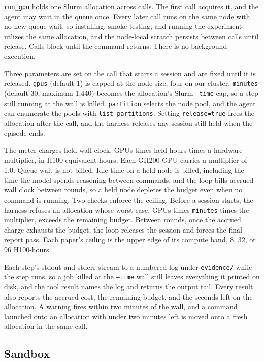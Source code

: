 \documentclass{article} %
\begin{document}
\texttt{run\_gpu} holds one Slurm allocation across calls. The first call
acquires it, and the agent may wait in the queue once. Every later call runs
on the same node with no new queue wait, so installing, smoke-testing, and
running the experiment utlizes the same allocation, and the node-local scratch
persists between calls until release. Calls block until the command returns.
There is no background execution.

Three parameters are set on the call that starts a session and are fixed
until it is released. \texttt{gpus} (default 1) is capped at the node size,
four on our cluster. \texttt{minutes} (default 30, maximum 1{,}440) becomes
the allocation's Slurm \texttt{--time} cap, so a step still running at the
wall is killed. \texttt{partition} selects the node pool, and the agent can
enumerate the pools with \texttt{list\_partitions}. Setting
\texttt{release=true} frees the allocation after the call, and the harness
releases any session still held when the episode ends.

The meter charges held wall clock, GPUs times held hours times a hardware
multiplier, in H100-equivalent hours. Each GH200 GPU carries a multiplier of
1.0.
Queue wait is not billed. Idle time on a held node is billed, including the
time the model spends reasoning between commands, and the loop bills accrued
wall clock between rounds, so a held node depletes the budget even when no
command is running. Two checks enforce the ceiling. Before a session starts,
the harness refuses an allocation whose worst case, GPUs times
\texttt{minutes} times the multiplier, exceeds the remaining budget. Between
rounds, once the accrued charge exhausts the budget, the loop releases the
session and forces the final report pass. Each paper's ceiling is the upper
edge of its compute band, 8, 32, or 96 H100-hours.

Each step's stdout and stderr stream to a numbered log under
\texttt{evidence/} while the step runs, so a job killed at the
\texttt{--time} wall still leaves everything it printed on disk, and the
tool result names the log and returns the output tail.
Every result also reports the accrued cost, the remaining budget, and the
seconds left on the allocation. A warning fires within two minutes of the
wall, and a command launched onto an allocation with under two minutes left
is moved onto a fresh allocation in the same call.

\subsection{Sandbox}
\label{app:sandbox}
\end{document}
